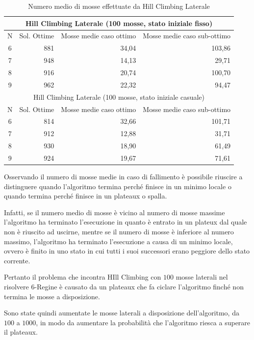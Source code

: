 \begin{table}[]
\centering
\begin{tabular}{|c|r|r|r|}
\hline
\multicolumn{4}{|c|}{Hill Climbing Laterale (100 mosse, stato iniziale fisso)} \\ \hline
N & \multicolumn{1}{c|}{Sol. Ottime} & \multicolumn{1}{c|}{Mosse medie caso ottimo} & \multicolumn{1}{c|}{Mosse medie caso sub-ottimo} \\ \hline
6 & 881 & 34,04 & 103,86 \\ \hline
7 & 948 & 14,13 & 29,71 \\ \hline
8 & 916 & 20,74 & 100,70 \\ \hline
9 & 962 & 22,32 & 94,47 \\ \hline
\multicolumn{4}{|c|}{Hill Climbing Laterale (100 mosse, stato iniziale casuale)} \\ \hline
N & \multicolumn{1}{c|}{Sol. Ottime} & \multicolumn{1}{c|}{Mosse medie caso ottimo} & \multicolumn{1}{c|}{Mosse medie caso sub-ottimo} \\ \hline
6 & 814 & 32,66 & 101,71 \\ \hline
7 & 912 & 12,88 & 31,71 \\ \hline
8 & 930 & 18,90 & 61,49 \\ \hline
9 & 924 & 19,67 & 71,61 \\ \hline
\end{tabular}
\caption{Numero medio di mosse effettuate da Hill Climbing Laterale}
\label{table:6regine-lat}
\end{table}

Osservando il numero di mosse medie in caso di fallimento è possibile riuscire a distinguere quando l'algoritmo termina perché finisce in un minimo locale o quando termina perché finisce in un plateaux o spalla.

Infatti, se il numero medio di mosse è vicino al numero di mosse massime l'algoritmo ha terminato l'esecuzione in quanto è entrato in un plateux dal quale non è riuscito ad uscirne, mentre se il numero di mosse è inferiore al numero massimo, l'algoritmo ha terminato l'esecuzione a causa di un minimo locale, ovvero è finito in uno stato in cui tutti i suoi successori erano peggiore dello stato corrente.

Pertanto il problema che incontra HIll Climbing con $100$ mosse laterali nel risolvere $6$-Regine è causato da un plateaux che fa ciclare l'algoritmo finché non termina le mosse a disposizione.

Sono state quindi aumentate le mosse laterali a disposizione dell'algoritmo, da $100$ a $1000$, in modo da aumentare la probabilità che l'algoritmo riesca a superare il plateaux.

